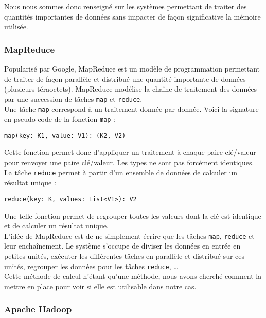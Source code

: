 Nous nous sommes donc renseigné sur les systèmes permettant de traiter des quantités importantes de données sans impacter de façon significative la mémoire utilisée.

\subsubsection{MapReduce}

Popularisé par Google, MapReduce est un modèle de programmation permettant de traiter de façon parallèle et distribué une quantité importante de données (plusieurs téraoctets). MapReduce modélise la chaîne de traitement des données par une succession de tâches \verb+map+ et \verb+reduce+.\\

Une tâche \verb+map+ correspond à un traitement donnée par donnée. Voici la signature en pseudo-code de la fonction \verb+map+ :

\begin{center}
 \verb+map(key: K1, value: V1): (K2, V2)+
\end{center}

Cette fonction permet donc d'appliquer un traitement à chaque paire clé/valeur pour renvoyer une paire clé/valeur. Les types ne sont pas forcément identiques. La tâche \verb+reduce+ permet à partir d'un ensemble de données de calculer un résultat unique :

\begin{center}
 \verb+reduce(key: K, values: List<V1>): V2+
\end{center}

Une telle fonction permet de regrouper toutes les valeurs dont la clé est identique et de calculer un résultat unique.\\

L'idée de MapReduce est de ne simplement écrire que les tâches \verb+map+, \verb+reduce+ et leur enchaînement. Le système s'occupe de diviser les données en entrée en petites unités, exécuter les différentes tâches en parallèle et distribué sur ces unités, regrouper les données pour les tâches \verb+reduce+, \dots{}\\

Cette méthode de calcul n'étant qu'une méthode, nous avons cherché comment la mettre en place pour voir si elle est utilisable dans notre cas.

\subsubsection{Apache Hadoop}

